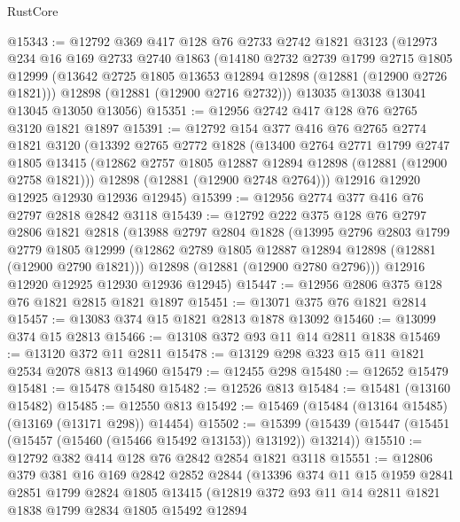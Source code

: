 \begin{lexlean}{RustCore}
\begin{coremodule}
@15343 := @12792
    @369
    @417
    @128
    @76
    @2733
    @2742
    @1821
    @3123
    (@12973
      @234
      @16
      @169
      @2733
      @2740
      @1863
      (@14180
        @2732
        @2739
        @1799
        @2715
        @1805
        @12999
        (@13642 @2725 @1805 @13653 @12894 @12898 (@12881 (@12900 @2726 @1821)))
        @12898
        (@12881 (@12900 @2716 @2732)))
      @13035
      @13038
      @13041
      @13045
      @13050
      @13056)
@15351 := @12956 @2742 @417 @128 @76 @2765 @3120 @1821 @1897
@15391 := @12792
    @154
    @377
    @416
    @76
    @2765
    @2774
    @1821
    @3120
    (@13392
      @2765
      @2772
      @1828
      (@13400
        @2764
        @2771
        @1799
        @2747
        @1805
        @13415
        (@12862 @2757 @1805 @12887 @12894 @12898 (@12881 (@12900 @2758 @1821)))
        @12898
        (@12881 (@12900 @2748 @2764)))
      @12916
      @12920
      @12925
      @12930
      @12936
      @12945)
@15399 := @12956 @2774 @377 @416 @76 @2797 @2818 @2842 @3118
@15439 := @12792
    @222
    @375
    @128
    @76
    @2797
    @2806
    @1821
    @2818
    (@13988
      @2797
      @2804
      @1828
      (@13995
        @2796
        @2803
        @1799
        @2779
        @1805
        @12999
        (@12862 @2789 @1805 @12887 @12894 @12898 (@12881 (@12900 @2790 @1821)))
        @12898
        (@12881 (@12900 @2780 @2796)))
      @12916
      @12920
      @12925
      @12930
      @12936
      @12945)
@15447 := @12956 @2806 @375 @128 @76 @1821 @2815 @1821 @1897
@15451 := @13071 @375 @76 @1821 @2814
@15457 := @13083 @374 @15 @1821 @2813 @1878 @13092
@15460 := @13099 @374 @15 @2813
@15466 := @13108 @372 @93 @11 @14 @2811 @1838
@15469 := @13120 @372 @11 @2811
@15478 := @13129 @298 @323 @15 @11 @1821 @2534 @2078 @813 @14960
@15479 := @12455 @298
@15480 := @12652 @15479
@15481 := @15478 @15480
@15482 := @12526 @813
@15484 := @15481 (@13160 @15482)
@15485 := @12550 @813
@15492 := @15469 (@15484 (@13164 @15485) (@13169 (@13171 @298)) @14454)
@15502 := @15399 (@15439 (@15447 (@15451 (@15457 (@15460 (@15466 @15492 @13153)) @13192)) @13214))
@15510 := @12792 @382 @414 @128 @76 @2842 @2854 @1821 @3118
@15551 := @12806
    @379
    @381
    @16
    @169
    @2842
    @2852
    @2844
    (@13396
      @374
      @11
      @15
      @1959
      @2841
      @2851
      @1799
      @2824
      @1805
      @13415
      (@12819
        @372
        @93
        @11
        @14
        @2811
        @1821
        @1838
        @1799
        @2834
        @1805
        @15492
        @12894

\end{coremodule}
\end{lexlean}
